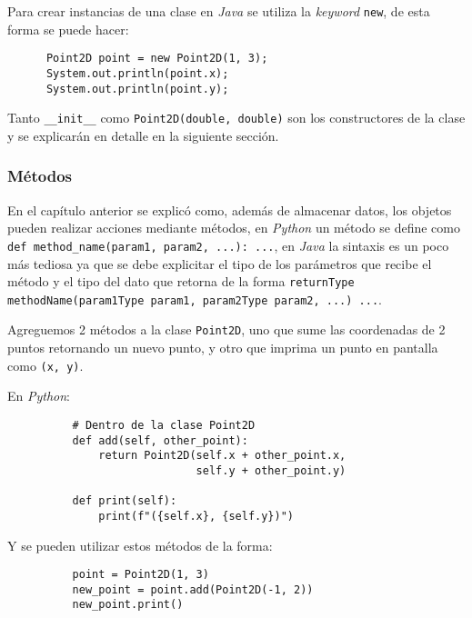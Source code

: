     Para crear instancias de una clase en \textit{Java} se utiliza la \textit{keyword} 
    \texttt{new}, de esta forma se puede hacer:

    \begin{verbatim}
      Point2D point = new Point2D(1, 3);
      System.out.println(point.x);
      System.out.println(point.y);
    \end{verbatim}

    Tanto \texttt{__init__} como \texttt{Point2D(double, double)} 
    son los constructores de la clase y se explicarán en detalle en la siguiente sección.

    \subsubsection{Métodos}
      En el capítulo anterior se explicó como, además de almacenar datos, los objetos 
      pueden realizar acciones mediante métodos, en \textit{Python} un método se define 
      como \texttt{def method_name(param1, param2, ...): ...}, en 
      \textit{Java} la sintaxis es un poco más tediosa ya que se debe explicitar el tipo 
      de los parámetros que recibe el método y el tipo del dato que retorna de la forma
      \texttt{returnType methodName(param1Type param1, param2Type param2, ...) {...}}.

      Agreguemos 2 métodos a la clase \texttt{Point2D}, uno que sume las coordenadas de 2
      puntos retornando un nuevo punto, y otro que imprima un punto en pantalla como 
      \texttt{(x, y)}.

      En \textit{Python}:
      \begin{listing}[ht!]
        \begin{verbatim}
          # Dentro de la clase Point2D
          def add(self, other_point):
              return Point2D(self.x + other_point.x,
                             self.y + other_point.y)
          
          def print(self):
              print(f"({self.x}, {self.y})")
        \end{verbatim}
      \end{listing}

      Y se pueden utilizar estos métodos de la forma:

      \begin{listing}[ht!]
        \begin{verbatim}
          point = Point2D(1, 3)
          new_point = point.add(Point2D(-1, 2))
          new_point.print()
        \end{verbatim}
      \end{listing}

